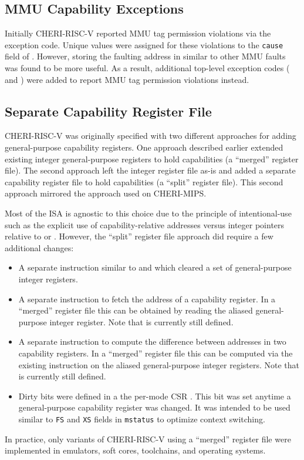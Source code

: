\subsection{MMU Capability Exceptions}

Initially CHERI-RISC-V reported MMU tag permission violations via the
\riscvcheriexception{} exception code.  Unique values were assigned
for these violations to the \texttt{cause} field of \xtval{}.
However, storing the faulting address in \xtval{} similar to other MMU
faults was found to be more useful.  As a result, additional top-level
exception codes (\riscvloadcappagefault{} and
\riscvstorecappagefault{}) were added to report MMU tag permission
violations instead.

\subsection{Separate Capability Register File}

CHERI-RISC-V was originally specified with two different approaches
for adding general-purpose capability registers.  One approach
described earlier extended existing integer general-purpose registers
to hold capabilities (a ``merged'' register file).  The second
approach left the integer register file as-is and added a separate
capability register file to hold capabilities (a ``split'' register
file).  This second approach mirrored the approach used on CHERI-MIPS.

Most of the ISA is agnostic to this choice due to the principle of
intentional-use such as the explicit use of capability-relative
addresses versus integer pointers relative to \DDC{} or \PCC{}.
However, the ``split'' register file approach did require a few
additional changes:

\begin{itemize}
\item A separate  instruction similar to
   and  which cleared a set
  of general-purpose integer registers.

\item A separate  instruction to fetch the address
  of a capability register.  In a ``merged'' register file this can be
  obtained by reading the aliased general-purpose integer register.
  Note that  is currently still defined.

\item A separate  instruction to compute the difference
  between addresses in two capability registers.  In a ``merged''
  register file this can be computed via the existing 
  instruction on the aliased general-purpose integer registers.  Note
  that  is currently still defined.

\item Dirty bits were defined in a the per-mode CSR \xccsr{}. This bit
  was set anytime a general-purpose capability register was changed.
  It was intended to be used similar to \texttt{FS} and \texttt{XS}
  fields in \texttt{mstatus} to optimize context switching.
\end{itemize}

In practice, only variants of CHERI-RISC-V using a ``merged'' register
file were implemented in emulators, soft cores, toolchains, and
operating systems.
